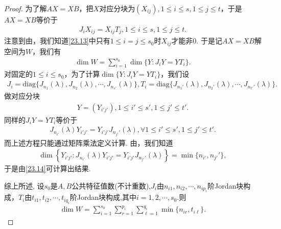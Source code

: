 \documentclass[../../main.tex]{subfiles}%
\begin{document}
\begin{proof}
为了解$AX = XB$，把$X$对应分块为$(X_{ij}), 1\leqslant i\leqslant s, 1\leqslant j\leqslant t$，于是$AX = XB$等价于
\begin{align}
J_iX_{ij} = X_{ij}T_j, 1\leqslant i\leqslant s, 1\leqslant j\leqslant t. \label{23.13}
\end{align}
注意到由，我们知道\eqref{23.13}中只有$1\leqslant i = j\leqslant s_0$时$X_{ij}$才能非$0$. 于是记$AX = XB$解空间为$W$，我们有
\begin{align}
\dim W = \sum_{i = 1}^{s_0}\dim\{Y : J_iY = YT_i\}. \label{23.14}
\end{align}
对固定的$1\leqslant i\leqslant s_0$，为了计算$\dim\{Y : J_iY = YT_i\}$，我们设
\begin{align*}
J_i = \mathrm{diag}\{J_{n_1}(\lambda), J_{n_2}(\lambda), \cdots, J_{n_{s'}}(\lambda)\}, T_i = \mathrm{diag}\{J_{n_1'}(\lambda), J_{n_2'}(\lambda), \cdots, J_{n_{t'}'}(\lambda)\}.
\end{align*}
做对应分块
\begin{align*}
Y = (Y_{i'j'}), 1\leqslant i'\leqslant s', 1\leqslant j'\leqslant t'.
\end{align*}
同样的$J_iY = YT_i$等价于
\begin{align}
J_{n_{i'}}(\lambda)Y_{i'j'} = Y_{i'j'}J_{n_{j'}'}(\lambda), \forall 1\leqslant i'\leqslant s', 1\leqslant j'\leqslant t'. \label{23.15}
\end{align}
而上述方程只能通过矩阵乘法定义计算. 由，我们知道
\begin{align*}
\dim\left\{Y_{i'j'} : J_{n_{i'}}(\lambda)Y_{i'j'} = Y_{i'j'}J_{n_{j'}'}(\lambda)\right\} = \min\{n_{i'}, n_{j'}'\},
\end{align*}
于是由\eqref{23.14}可计算出结果. 

综上所述,
设$s_0$是$A, B$公共特征值数(不计重数),$J_i$由$n_{i1}, n_{i2}, \cdots, n_{ip_i}$阶Jordan块构成，$T_i$由$t_{i1}, t_{i2}, \cdots, t_{iq_i}$阶Jordan块构成,其中$i=1,2,\cdots,s_0$.则
\begin{align}
\dim W = \sum_{i = 1}^{s_0}\sum_{r = 1}^{p_i}\sum_{\ell = 1}^{q_i}\min\{n_{ir}, t_{i\ell}\}. \label{23.16}
\end{align}\end{proof}
\end{document}
